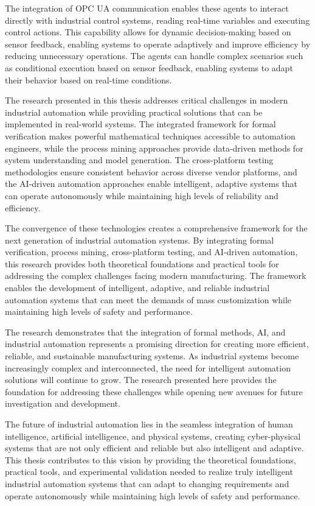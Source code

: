 The integration of OPC UA communication enables these agents to interact directly with industrial control systems, reading real-time variables and executing control actions. This capability allows for dynamic decision-making based on sensor feedback, enabling systems to operate adaptively and improve efficiency by reducing unnecessary operations. The agents can handle complex scenarios such as conditional execution based on sensor feedback, enabling systems to adapt their behavior based on real-time conditions.

The research presented in this thesis addresses critical challenges in modern industrial automation while providing practical solutions that can be implemented in real-world systems. The integrated framework for formal verification makes powerful mathematical techniques accessible to automation engineers, while the process mining approaches provide data-driven methods for system understanding and model generation. The cross-platform testing methodologies ensure consistent behavior across diverse vendor platforms, and the AI-driven automation approaches enable intelligent, adaptive systems that can operate autonomously while maintaining high levels of reliability and efficiency.

The convergence of these technologies creates a comprehensive framework for the next generation of industrial automation systems. By integrating formal verification, process mining, cross-platform testing, and AI-driven automation, this research provides both theoretical foundations and practical tools for addressing the complex challenges facing modern manufacturing. The framework enables the development of intelligent, adaptive, and reliable industrial automation systems that can meet the demands of mass customization while maintaining high levels of safety and performance.

The research demonstrates that the integration of formal methods, AI, and industrial automation represents a promising direction for creating more efficient, reliable, and sustainable manufacturing systems. As industrial systems become increasingly complex and interconnected, the need for intelligent automation solutions will continue to grow. The research presented here provides the foundation for addressing these challenges while opening new avenues for future investigation and development.

The future of industrial automation lies in the seamless integration of human intelligence, artificial intelligence, and physical systems, creating cyber-physical systems that are not only efficient and reliable but also intelligent and adaptive. This thesis contributes to this vision by providing the theoretical foundations, practical tools, and experimental validation needed to realize truly intelligent industrial automation systems that can adapt to changing requirements and operate autonomously while maintaining high levels of safety and performance.

